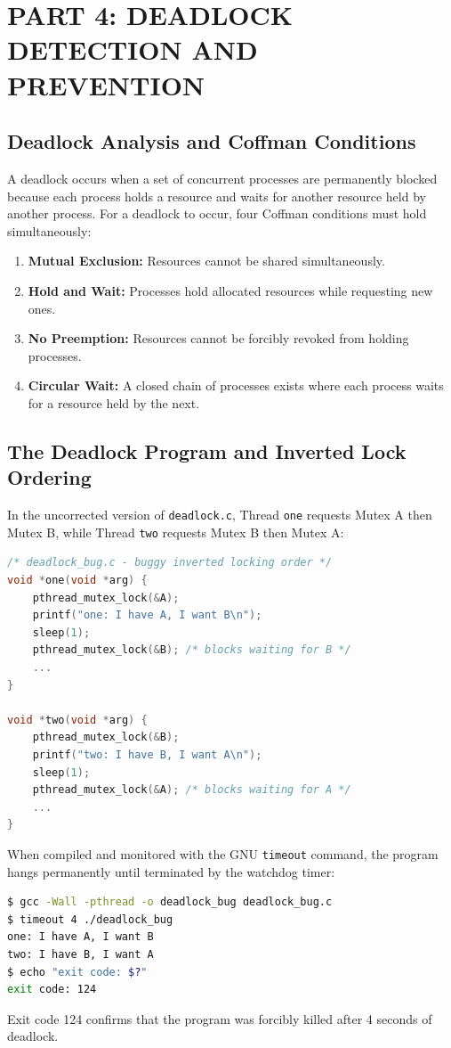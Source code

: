 \documentclass[12pt,a4paper]{report}
\numberwithin{equation}{chapter}
\numberwithin{figure}{chapter}
\numberwithin{table}{chapter}
\begin{document}
\chapter{PART 4: DEADLOCK DETECTION AND PREVENTION}

\section{Deadlock Analysis and Coffman Conditions}
A deadlock occurs when a set of concurrent processes are permanently blocked because each process holds a resource and waits for another resource held by another process. For a deadlock to occur, four Coffman conditions must hold simultaneously:
\begin{enumerate}
    \item \textbf{Mutual Exclusion:} Resources cannot be shared simultaneously.
    \item \textbf{Hold and Wait:} Processes hold allocated resources while requesting new ones.
    \item \textbf{No Preemption:} Resources cannot be forcibly revoked from holding processes.
    \item \textbf{Circular Wait:} A closed chain of processes exists where each process waits for a resource held by the next.
\end{enumerate}

\section{The Deadlock Program and Inverted Lock Ordering}
In the uncorrected version of \texttt{deadlock.c}, Thread \texttt{one} requests Mutex A then Mutex B, while Thread \texttt{two} requests Mutex B then Mutex A:

\begin{lstlisting}[language=C]
/* deadlock_bug.c - buggy inverted locking order */
void *one(void *arg) {
    pthread_mutex_lock(&A);
    printf("one: I have A, I want B\n");
    sleep(1);
    pthread_mutex_lock(&B); /* blocks waiting for B */
    ...
}

void *two(void *arg) {
    pthread_mutex_lock(&B);
    printf("two: I have B, I want A\n");
    sleep(1);
    pthread_mutex_lock(&A); /* blocks waiting for A */
    ...
}
\end{lstlisting}

When compiled and monitored with the GNU \texttt{timeout} command, the program hangs permanently until terminated by the watchdog timer:
\begin{lstlisting}[language=bash]
$ gcc -Wall -pthread -o deadlock_bug deadlock_bug.c
$ timeout 4 ./deadlock_bug
one: I have A, I want B
two: I have B, I want A
$ echo "exit code: $?"
exit code: 124
\end{lstlisting}
Exit code 124 confirms that the program was forcibly killed after 4 seconds of deadlock.
\end{document}
